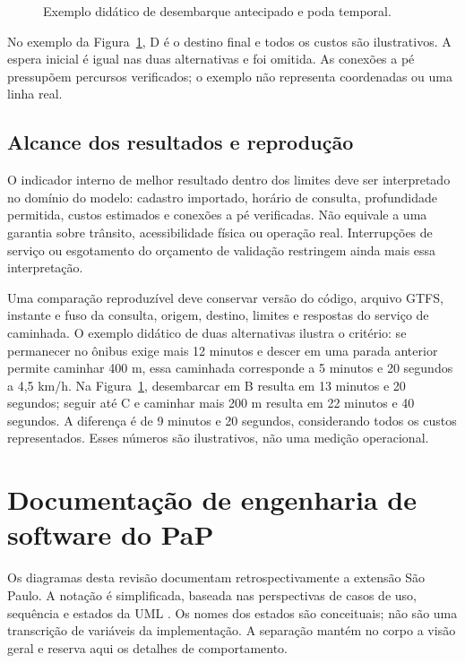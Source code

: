 \documentclass[12pt,oneside,a4paper,brazil,chapter=TITLE]{abntex2}
\let\papsection\section
\renewcommand{\section}{\clearpage\papsection}
\begin{document}
\begin{apendicesenv}
\begin{figure}[H]
\centering
\caption{Exemplo didático de desembarque antecipado e poda temporal.}\label{fig:grafo-poda}
\end{figure}

No exemplo da Figura~\ref{fig:grafo-poda}, D é o destino final e todos os custos são ilustrativos. A espera inicial é igual nas duas alternativas e foi omitida. As conexões a pé pressupõem percursos verificados; o exemplo não representa coordenadas ou uma linha real.

\section{Alcance dos resultados e reprodução}
O indicador interno de melhor resultado dentro dos limites deve ser interpretado no domínio do modelo: cadastro importado, horário de consulta, profundidade permitida, custos estimados e conexões a pé verificadas. Não equivale a uma garantia sobre trânsito, acessibilidade física ou operação real. Interrupções de serviço ou esgotamento do orçamento de validação restringem ainda mais essa interpretação.

Uma comparação reproduzível deve conservar versão do código, arquivo GTFS, instante e fuso da consulta, origem, destino, limites e respostas do serviço de caminhada. O exemplo didático de duas alternativas ilustra o critério: se permanecer no ônibus exige mais 12 minutos e descer em uma parada anterior permite caminhar 400 m, essa caminhada corresponde a 5 minutos e 20 segundos a 4,5 km/h. Na Figura~\ref{fig:grafo-poda}, desembarcar em B resulta em 13 minutos e 20 segundos; seguir até C e caminhar mais 200 m resulta em 22 minutos e 40 segundos. A diferença é de 9 minutos e 20 segundos, considerando todos os custos representados. Esses números são ilustrativos, não uma medição operacional.

\chapter{Documentação de engenharia de software do PaP}\label{ap:engenharia}
Os diagramas desta revisão documentam retrospectivamente a extensão São Paulo. A notação é simplificada, baseada nas perspectivas de casos de uso, sequência e estados da UML \citep{uml251}. Os nomes dos estados são conceituais; não são uma transcrição de variáveis da implementação. A separação mantém no corpo a visão geral e reserva aqui os detalhes de comportamento.

\end{apendicesenv}
\end{document}
